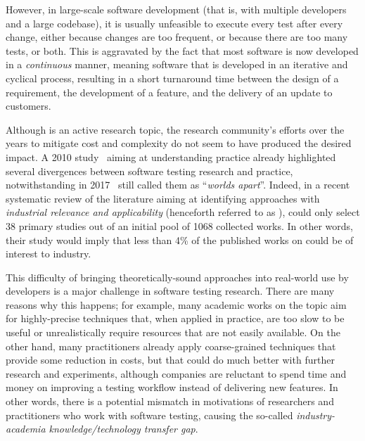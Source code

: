 However, in large-scale software development (that is, with multiple developers and a large codebase), it is usually unfeasible to execute every test after every change, either because changes are too frequent, or because there are too many tests, or both.
This is aggravated by the fact that most software is now developed in a \textit{continuous} manner, meaning software that is developed in an iterative and cyclical process, resulting in a short turnaround time between the design of a requirement, the development of a feature, and the delivery of an update to customers.


Although \rt is an active research topic, the research community's efforts over the years to mitigate \rt cost and complexity do not seem to have produced the desired impact.
A 2010 study~\cite{engstrom2010qualitative} aiming at understanding \rt practice already highlighted several divergences between software testing research and practice,
notwithstanding in 2017~\citet{garousi2017worlds}  
still called them as ``\textit{worlds apart}''. 
Indeed, in a recent systematic review of the \rt literature aiming at identifying approaches with \textit{industrial relevance and applicability} (henceforth referred to as \rea),
\citet{bin_ali_search_2019} could  only select 38 primary studies out of an initial pool of 1068 collected works.
In other words, their study would imply that 
less than 4\% of the published works on \rt could be of interest to industry.

This difficulty of bringing theoretically-sound approaches into real-world use by developers is a major challenge in software testing research.
There are many reasons why this happens; for example, many academic works on the topic aim for highly-precise techniques that, when applied in practice, are too slow to be useful or unrealistically require resources that are not easily available.
On the other hand, many practitioners already apply coarse-grained techniques that provide some reduction in costs, but that could do much better with further research and experiments, although companies are reluctant to spend time and money on improving a testing workflow instead of delivering new features.
In other words, there is a potential mismatch in motivations of researchers and practitioners who work with software testing, causing the so-called \textit{industry-academia knowledge/technology transfer gap}.

